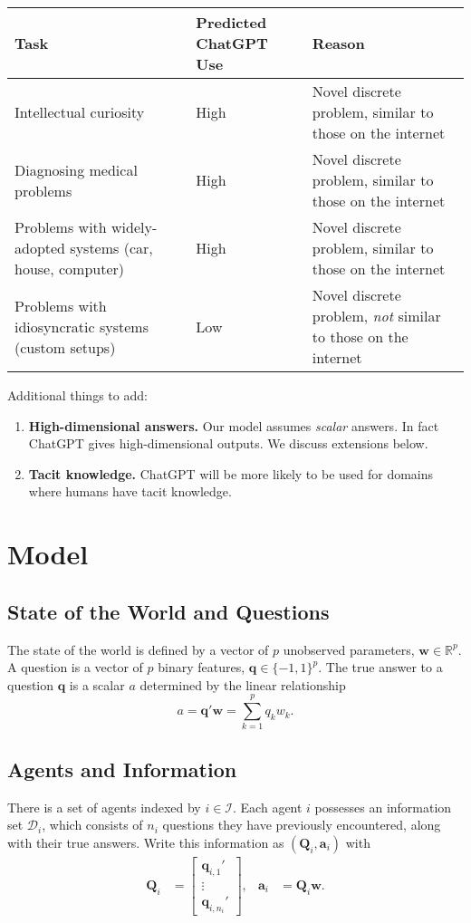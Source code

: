 \documentclass[11pt]{article}
\begin{document}
\begin{center}
\begin{tabular}{p{}p{}p{}}
\toprule
Task & Predicted ChatGPT Use & Reason \\
\midrule
Intellectual curiosity & High & Novel discrete problem, similar to those on the internet \\
Diagnosing medical problems & High & Novel discrete problem, similar to those on the internet \\
Problems with widely-adopted systems (car, house, computer) & High & Novel discrete problem, similar to those on the internet \\
Problems with idiosyncratic systems (custom setups) & Low & Novel discrete problem, \emph{not} similar to those on the internet \\
\bottomrule
\end{tabular}
\end{center}

Additional things to add:
\begin{enumerate}[label=\arabic*., leftmargin=2em]
  \item \textbf{High-dimensional answers.} Our model assumes \emph{scalar} answers. In fact ChatGPT gives high-dimensional outputs. We discuss extensions below.
  \item \textbf{Tacit knowledge.} ChatGPT will be more likely to be used for domains where humans have tacit knowledge.
\end{enumerate}

\section{Model}

\subsection*{State of the World and Questions}
The state of the world is defined by a vector of $p$ unobserved parameters, $\bm{w} \in \mathbb{R}^p$. A question is a vector of $p$ binary features, $\bm{q} \in \{-1, 1\}^p$. The true answer to a question $\bm{q}$ is a scalar $a$ determined by the linear relationship
$$a = \bm{q}'\bm{w} = \sum_{k=1}^p q_k w_k.$$

\subsection*{Agents and Information}
There is a set of agents indexed by $i \in \mathcal{I}$. Each agent $i$ possesses an information set $\mathcal{D}_i$, which consists of $n_i$ questions they have previously encountered, along with their true answers. Write this information as $(\bm{Q}_i, \bm{a}_i)$ with
\begin{align*}
\bm{Q}_i &= \begin{bmatrix} \bm{q}_{i,1}' \\ \vdots \\ \bm{q}_{i,n_i}' \end{bmatrix}, &
\bm{a}_i &= \bm{Q}_i \bm{w}.
\end{align*}
\end{document}
